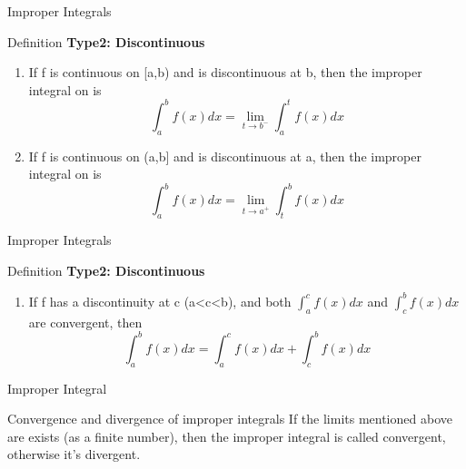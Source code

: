 \documentclass{beamer}
\begin{document}
\begin{frame}{Improper Integrals}
\begin{block}{Definition}
\textbf{Type2: Discontinuous}
    \begin{enumerate}
        
    
        \item If f is continuous on [a,b) and is discontinuous at b, then the improper integral on is
        \begin{equation*}
            \int_a^{b} f(x)dx = \lim_{t\rightarrow b^-}\int_{a}^{t}f(x)dx
        \end{equation*}
        
        \item 
        If f is continuous on (a,b] and is discontinuous at a, then the improper integral on is
        \begin{equation*}
            \int_a^{b} f(x)dx = \lim_{t\rightarrow a^+}\int_{t}^{b}f(x)dx
        \end{equation*}
        
        
   
    \end{enumerate}
    
\end{block}
\end{frame}

\begin{frame}{Improper Integrals}
\begin{block}{Definition}
\textbf{Type2: Discontinuous}
    \begin{enumerate}[3]
        
        \item  
         If f has a discontinuity at c (a<c<b), and both $\int_{a}^{c}f(x)dx$ and  $\int_{c}^{b}f(x)dx$ are convergent, then
        \begin{equation*}
            \int_a^{b} f(x)dx = \int_{a}^{c}f(x)dx + \int_{c}^{b}f(x)dx
        \end{equation*}
   
    \end{enumerate}
    
\end{block}
\end{frame}



\begin{frame}{Improper Integral}
    \begin{block}{Convergence and divergence of improper integrals}
        If the limits mentioned above are exists (as a finite number), then the improper integral is called convergent, otherwise it's divergent.
    \end{block}
\end{frame}
\end{document}

